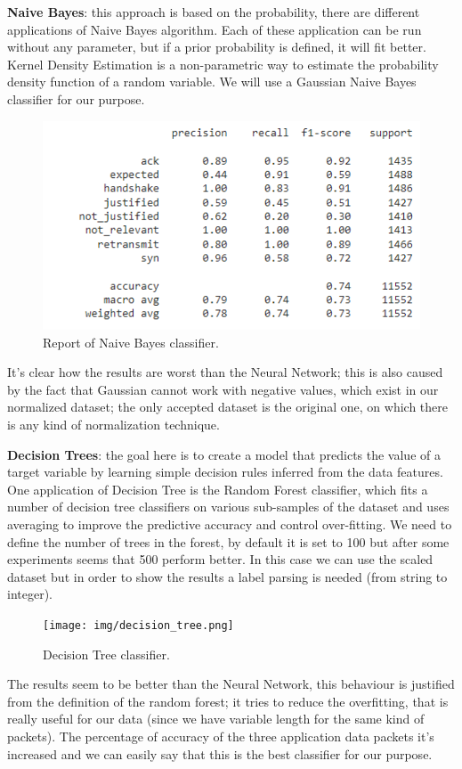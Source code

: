 \documentclass[sigconf]{acmart}
\begin{document}
    \textbf{Naive Bayes}: this approach is based on the probability, there are different applications of Naive Bayes algorithm. Each of these application can be run without any parameter, but if a prior probability is defined, it will fit better. Kernel Density Estimation is a non-parametric way to estimate the probability density function of a random variable. We will use a Gaussian Naive Bayes classifier for our purpose.
    \begin{figure}[h!]
        \includegraphics[width=\linewidth]{img/nb_classifier.png}
        \caption{Report of Naive Bayes classifier.}
        \label{fig:nb_classifier}
    \end{figure}
    It's clear how the results are worst than the Neural Network; this is also caused by the fact that Gaussian cannot work with negative values, which exist in our normalized dataset; the only accepted dataset is the original one, on which there is any kind of normalization technique.

    \textbf{Decision Trees}: the goal here is to create a model that predicts the value of a target variable by learning simple decision rules inferred from the data features. One application of Decision Tree is the Random Forest classifier, which fits a number of decision tree classifiers on various sub-samples of the dataset and uses averaging to improve the predictive accuracy and control over-fitting. We need to define the number of trees in the forest, by default it is set to 100 but after some experiments seems that 500 perform better.
In this case we can use the scaled dataset but in order to show the results a label parsing is needed (from string to integer).
    \begin{figure}[h!]
        \texttt{[image: img/decision\_tree.png]}
        \caption{Decision Tree classifier.}
        \label{fig:decision_tree}
    \end{figure}
The results seem to be better than the Neural Network, this behaviour is justified from the definition of the random forest; it tries to reduce the overfitting, that is really useful for our data (since we have variable length for the same kind of packets). The percentage of accuracy of the three application data packets it's increased and we can easily say that this is the best classifier for our purpose.
\end{document}
